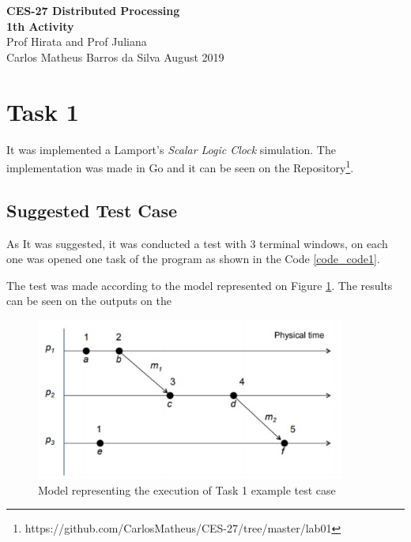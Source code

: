 \documentclass[a4paper, 11pt]{article}
\begin{document}
\noindent
\large\textbf{CES-27 Distributed Processing} \\
\textbf{1th Activity} \\
\normalsize Prof Hirata and Prof Juliana  \\
Carlos Matheus Barros da Silva \hfill August 2019

\section*{Task 1}

It was implemented a Lamport's \textit{Scalar Logic Clock} simulation. The implementation was made in Go and it can be seen on the Repository\footnote{https://github.com/CarlosMatheus/CES-27/tree/master/lab01}.

\subsection*{Suggested Test Case}

As It was suggested, it was conducted a test with 3 terminal windows, on each one was opened one task of the program as shown in the Code \ref{code_code1}.

The test was made according to the model represented on Figure \ref{img_task1}. The results can be seen on the outputs on the

\begin{figure}[h]
  \begin{center}
  \includegraphics[width=4in]{./imgs/scalar.jpeg}
  \caption{Model representing the execution of Task 1 example test case}
  \label{img_task1}
  \end{center}
\end{figure}


\end{document}
